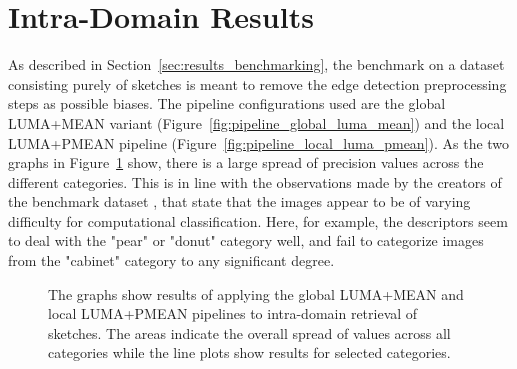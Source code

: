 \section{Intra-Domain Results}\label{sec:intra_results}

As described in Section~\ref{sec:results_benchmarking}, the benchmark on a
dataset consisting purely of sketches is meant to remove the edge detection
preprocessing steps as possible biases. The pipeline configurations used are
the global LUMA+MEAN variant (Figure~\ref{fig:pipeline_global_luma_mean}) and
the local LUMA+PMEAN pipeline (Figure~\ref{fig:pipeline_local_luma_pmean}). As
the two graphs in Figure~\ref{fig:results_precision} show, there is a large
spread of precision values across the different categories. This is in line
with the observations made by the creators of the benchmark dataset
\autocite{eitz_how_2012}, that state that the images appear to be of varying
difficulty for computational classification. Here, for example, the descriptors
seem to deal with the "pear" or "donut" category well, and fail to categorize
images from the "cabinet" category to any significant degree.

\begin{figure}[h]
    \centering
    \quad
    \caption[Precision and Recall Results]{
        The graphs show results of applying the global LUMA+MEAN
         and local LUMA+PMEAN
         pipelines to
        intra-domain retrieval of sketches. The areas indicate the overall
        spread of values across all categories while the line plots show
        results for selected categories.
    }
    \label{fig:results_precision}
\end{figure}

